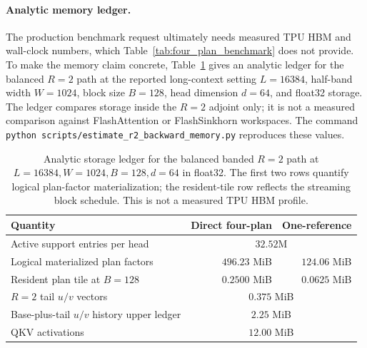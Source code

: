 \paragraph{Analytic memory ledger.}
The production benchmark request ultimately needs measured TPU HBM and wall-clock numbers, which Table~\ref{tab:four_plan_benchmark} does not provide. To make the memory claim concrete, Table~\ref{tab:r2_memory_ledger} gives an analytic ledger for the balanced $R=2$ path at the reported long-context setting $L=16384$, half-band width $W=1024$, block size $B=128$, head dimension $d=64$, and float32 storage. The ledger compares storage inside the $R=2$ adjoint only; it is not a measured comparison against FlashAttention or FlashSinkhorn workspaces. The command \texttt{python scripts/estimate\_r2\_backward\_memory.py} reproduces these values.

\begin{table}[h]
    \centering
    \begin{tabular}{@{}lrr@{}}
        \toprule
        Quantity & Direct four-plan & One-reference \\
        \midrule
        Active support entries per head & \multicolumn{2}{c}{$32.52$M} \\
        Logical materialized plan factors & $496.23$ MiB & $124.06$ MiB \\
        Resident plan tile at $B=128$ & $0.2500$ MiB & $0.0625$ MiB \\
        $R=2$ tail $u/v$ vectors & \multicolumn{2}{c}{$0.375$ MiB} \\
        Base-plus-tail $u/v$ history upper ledger & \multicolumn{2}{c}{$2.25$ MiB} \\
        QKV activations & \multicolumn{2}{c}{$12.00$ MiB} \\
        \bottomrule
    \end{tabular}
    \caption{Analytic storage ledger for the balanced banded $R=2$ path at $L=16384,W=1024,B=128,d=64$ in float32. The first two rows quantify logical plan-factor materialization; the resident-tile row reflects the streaming block schedule. This is not a measured TPU HBM profile.}
    \label{tab:r2_memory_ledger}
\end{table}

